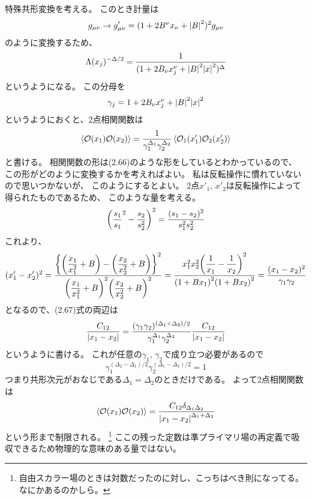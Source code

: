 \documentclass[../../master.tex]{subfiles}
\begin{document}
特殊共形変換を考える。
このとき計量は
\begin{equation*}
    g_{\mu\nu} \rightarrow g'_{\mu\nu} = (1+2B^\nu x_\nu +\abs{B}^2)^2 g_{\mu\nu}
\end{equation*}
のように変換するため、
\begin{equation*}
    \Lambda(x_j)^{-\Delta/2} = \frac{1}{(1+2B_\nu x_j^\nu +\abs{B}^2\abs{x}^2)^{\Delta}}
\end{equation*}
というようになる。
この分母を
\setcounter{equation}{67}
\begin{equation}
    \gamma_j = 1+2B_\nu x_j^\nu +\abs{B}^2\abs{x}^2
\end{equation}
というようにおくと、2点相関関数は
\setcounter{equation}{66}
\begin{equation}
    \ev{\mathcal{O}(x_1)\mathcal{O}(x_2)} = \frac{1}{\gamma_1^{\Delta_1}\gamma_2^{\Delta_2}}\ev{\mathcal{O}_1(x'_1)\mathcal{O}_2(x'_2)}
\end{equation}
と書ける。
\setcounter{equation}{68}
相関関数の形は(2.66)のような形をしているとわかっているので、
この形がどのように変換するかを考えればよい。
私は反転操作に慣れていないので思いつかないが、
このようにするとよい。
2点\(x'_1,\,x'_2\)は反転操作によって得られたものであるため、
このような量を考える。
\begin{equation*}
    \qty(\frac{s_1}{s_1}^2-\frac{s_2}{s_2^2})^2
    =\frac{(s_1-s_2)^2}{s_1^2s_2^2}
\end{equation*}
これより、
\begin{equation}
    (x'_1-x'_2)^2 = \dfrac{\qty{\qty(\dfrac{x_1}{x_1^2}+B)-\qty(\dfrac{x_2}{x_2^2}+B)}^2}{\qty(\dfrac{x_1}{x_1^2}+B)^2\qty(\dfrac{x_2}{x_2^2}+B)^2}
    =\dfrac{x_1^2x_2^2\qty(\dfrac{1}{x_1}-\dfrac{1}{x_2})^2}{\qty(1+Bx_1)^2\qty(1+Bx_2)^2} = \frac{(x_1-x_2)^2}{\gamma_1\gamma_2}
\end{equation}
となるので、(2.67)式の両辺は
\begin{equation}
    \frac{C_{12}}{\abs{x_1-x_2}}=\frac{(\gamma_1\gamma_2)^{(\Delta_1+\Delta_2)/2}}{\gamma_1^{\Delta_1}\gamma_2^{\Delta_2}}\frac{C_{12}}{\abs{x_1-x_2}}
\end{equation}
というように書ける。
これが任意の\(\gamma_1,\,\gamma_2\)で成り立つ必要があるので
\begin{equation*}
    \gamma_1^{(\Delta_2-\Delta_1)/2}\gamma_2^{(\Delta_1-\Delta_2)/2} = 1
\end{equation*}
つまり共形次元がおなじである\(\Delta_1=\Delta_2\)のときだけである。
よって2点相関関数は
\begin{equation}
    \ev{\mathcal{O}(x_1)\mathcal{O}(x_2)}= \frac{C_{12}\delta_{\Delta_1\Delta_2}}{\abs{x_1-x_2}^{\Delta_1 + \Delta_2}}
\end{equation}
という形まで制限される。
\footnote{自由スカラー場のときは対数だったのに対し、こっちはべき則になってる。なにかあるのかしら。}
ここの残った定数は準プライマリ場の再定義で吸収できるため物理的な意味のある量ではない。
\end{document}
